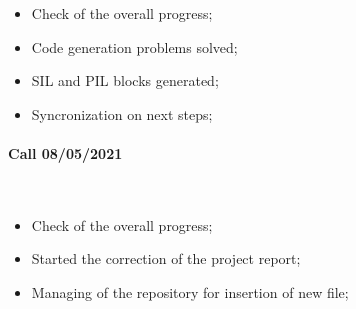 \documentclass[12pt,a4paper]{report}
\begin{document}
\begin{itemize}
	\item Check of the overall progress;
	
	\item Code generation problems solved;
	
	\item SIL and PIL blocks generated;
	
	\item Syncronization on next steps;
	
\end{itemize}

\paragraph{Call 08/05/2021 \\}~

\begin{itemize}
	\item Check of the overall progress;
	
	\item Started the correction of the project report;
	
	\item Managing of the repository for insertion of new file;
	
\end{itemize}
\end{document}
